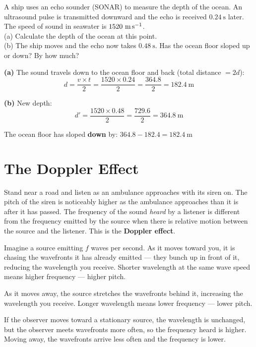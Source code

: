 \begin{examplebox}[18.3]
A ship uses an echo sounder (SONAR) to measure
the depth of the ocean. An ultrasound pulse is
transmitted downward and the echo is received
$0.24\ \text{s}$ later. The speed of sound in
seawater is $1520\ \text{m\,s}^{-1}$.\\
(a) Calculate the depth of the ocean at this point.\\
(b) The ship moves and the echo now takes $0.48\ \text{s}$.
Has the ocean floor sloped up or down? By how much?
\end{examplebox}

\begin{solutionbox}
\textbf{(a)} The sound travels down to the ocean
floor and back (total distance $= 2d$):
\[
  d = \frac{v \times t}{2}
  = \frac{1520 \times 0.24}{2}
  = \frac{364.8}{2} = 182.4\ \text{m}
\]

\textbf{(b)} New depth:
\[
  d' = \frac{1520 \times 0.48}{2}
  = \frac{729.6}{2} = 364.8\ \text{m}
\]

The ocean floor has sloped \textbf{down} by:
$364.8 - 182.4 = 182.4\ \text{m}$
\end{solutionbox}

\section{The Doppler Effect}

Stand near a road and listen as an ambulance approaches
with its siren on. The pitch of the siren is noticeably
higher as the ambulance approaches than it is after
it has passed. The frequency of the sound \textit{heard}
by a listener is different from the frequency emitted
by the source when there is relative motion between
the source and the listener. This is the
\textbf{Doppler effect}.

\begin{keybox}
Imagine a source emitting $f$ waves per second. As it
moves toward you, it is chasing the wavefronts it has
already emitted --- they bunch up in front of it,
reducing the wavelength you receive. Shorter wavelength
at the same wave speed means higher frequency --- higher
pitch.

As it moves away, the source stretches the wavefronts
behind it, increasing the wavelength you receive.
Longer wavelength means lower frequency --- lower pitch.

If the observer moves toward a stationary source, the wavelength is
unchanged, but the observer meets wavefronts more often, so the
frequency heard is higher. Moving away, the wavefronts arrive less
often and the frequency is lower.
\end{keybox}

